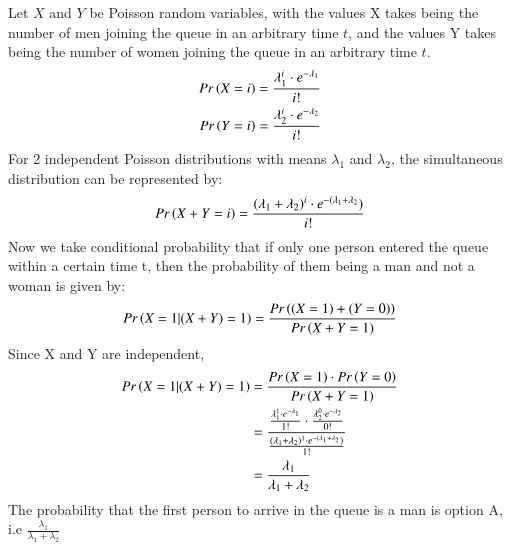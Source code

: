 Let $X$ and $Y$ be Poisson random variables, with the values X takes being the number of men joining the queue in an arbitrary time $t$, and the values Y takes being the number of women joining the queue in an arbitrary time $t$.
\begin{align}
    Pr\left(X=i\right)&=\frac{\lambda_1^i\cdot e^{-\lambda_1}}{i!}\\
    Pr\left(Y=i\right)&=\frac{\lambda_2^i\cdot e^{-\lambda_2}}{i!}
\end{align}
For 2 independent Poisson distributions with means $\lambda_1$ and $\lambda_2$, the simultaneous distribution can be represented by:
\begin{align}
    Pr\left(X+Y=i\right)=\frac{(\lambda_1+\lambda_2)^i\cdot e^{-(\lambda_1+\lambda_2})}{i!}
\end{align}
Now we take conditional probability that if only one person entered the queue within a certain time t, then the probability of them being a man and not a woman is given by:
\begin{align}
    Pr\left(X=1|(X+Y)=1\right)&=\frac{Pr\left((X=1) + (Y=0)\right)}{Pr\left(X+Y=1\right)}\\
\end{align}
Since X and Y are independent, 
\begin{align}
    Pr\left(X=1|(X+Y)=1\right)&=\frac{Pr\left(X=1\right)\cdot Pr\left(Y=0\right)}{Pr\left(X+Y=1\right)}\\
    &=\frac{\frac{\lambda_1^1\cdot e^{-\lambda_1}}{1!}\cdot \frac{\lambda_2^0\cdot e^{-\lambda_2}}{0!}}{\frac{(\lambda_1+\lambda_2)^1\cdot e^{-(\lambda_1+\lambda_2})}{1!}}\\
    &=\frac{\lambda_1}{\lambda_1+\lambda_2}
\end{align}
 The probability that the first person to arrive in the queue is a man is option A, i.e $\frac{\lambda_1}{\lambda_1+\lambda_2}$
